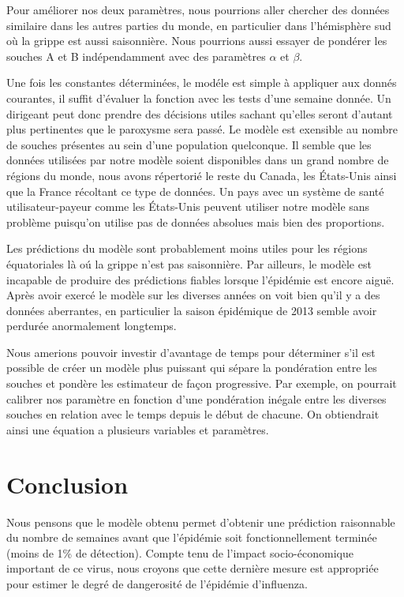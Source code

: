 \documentclass[12pt]{article}
\begin{document}
Pour am\'eliorer nos deux param\`etres, nous pourrions aller chercher des donn\'ees similaire dans les autres parties du monde, en particulier dans l'h\'emisph\`ere sud o\`u la grippe
est aussi saisonni\`ere. Nous pourrions aussi essayer de pond\'erer les souches A et B ind\'ependamment avec des param\`etres $\alpha$ et $\beta$.

Une fois les constantes d\'etermin\'ees, le mod\'ele est simple \`a appliquer aux donn\'es courantes, il suffit d'\'evaluer la fonction avec les tests d'une semaine donn\'ee. Un dirigeant
peut donc prendre des d\'ecisions utiles sachant qu'elles seront d'autant plus pertinentes que le paroxysme sera pass\'e. Le mod\`ele est exensible au nombre de souches pr\'esentes au sein
d'une population quelconque. Il semble que les donn\'ees utilis\'ees par notre mod\`ele soient disponibles dans un grand nombre de r\'egions du monde, nous avons r\'epertori\'e le reste du
Canada\cite{InfluenzaCAN},
les \'Etats-Unis\cite{InfuenzaUSA} ainsi que la
France\cite{InfluenzaFRA}
r\'ecoltant ce type de donn\'ees. Un pays avec un syst\`eme de sant\'e utilisateur-payeur comme les \'Etats-Unis peuvent utiliser
notre mod\`ele sans probl\`eme puisqu'on utilise pas de donn\'ees absolues mais bien des proportions.

Les pr\'edictions du mod\`ele sont probablement moins utiles pour les r\'egions \'equatoriales l\`a o\'u la grippe n'est pas saisonni\`ere. Par ailleurs, le mod\`ele est incapable de produire
des pr\'edictions fiables lorsque l'\'epid\'emie est encore aigu\"e. Apr\`es avoir exerc\'e le mod\`ele sur les diverses ann\'ees on voit bien qu'il y a des donn\'ees aberrantes, en particulier
la saison \'epid\'emique de 2013 semble avoir perdur\'ee anormalement longtemps.

Nous amerions pouvoir investir d'avantage de temps pour d\'eterminer s'il est possible de cr\'eer un mod\`ele plus puissant qui s\'epare la pond\'eration entre les souches
et pond\`ere les estimateur de fa\c con progressive. Par exemple, on pourrait calibrer nos param\`etre en fonction d'une pond\'eration in\'egale entre les diverses souches
en relation avec le temps depuis le d\'ebut de chacune. On obtiendrait ainsi une \'equation a plusieurs variables et param\`etres.

\section{Conclusion}
Nous pensons que le mod\`ele obtenu permet d'obtenir une pr\'ediction raisonnable du nombre de semaines avant que l'\'epid\'emie soit fonctionnellement termin\'ee (moins de 1\% de d\'etection).
Compte tenu de l'impact socio-\'economique important de ce virus, nous croyons que cette derni\`ere mesure est appropri\'ee pour estimer le degr\'e de dangerosit\'e de l'\'epid\'emie d'influenza.
\end{document}
